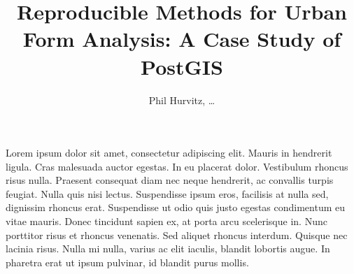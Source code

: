 \documentclass[12pt,letterpaper]{article} %
\title{Reproducible Methods for Urban Form Analysis: A Case Study of PostGIS}
\author{Phil Hurvitz, \ldots}
\date{}
\begin{document}
\maketitle

Lorem ipsum dolor sit amet, consectetur adipiscing elit. Mauris in
hendrerit ligula. Cras malesuada auctor egestas. In eu placerat
dolor. Vestibulum rhoncus risus nulla. Praesent consequat diam nec
neque hendrerit, ac convallis turpis feugiat. Nulla quis nisi
lectus. Suspendisse ipsum eros, facilisis at nulla sed, dignissim
rhoncus erat. Suspendisse ut odio quis justo egestas condimentum eu
vitae mauris. Donec tincidunt sapien ex, at porta arcu scelerisque
in. Nunc porttitor risus et rhoncus venenatis. Sed aliquet rhoncus
interdum. Quisque nec lacinia risus. Nulla mi nulla, varius ac elit
iaculis, blandit lobortis augue. In pharetra erat ut ipsum pulvinar,
id blandit purus mollis.

\cite{Forsyth2014sausage}


\printbibliography
\end{document}
